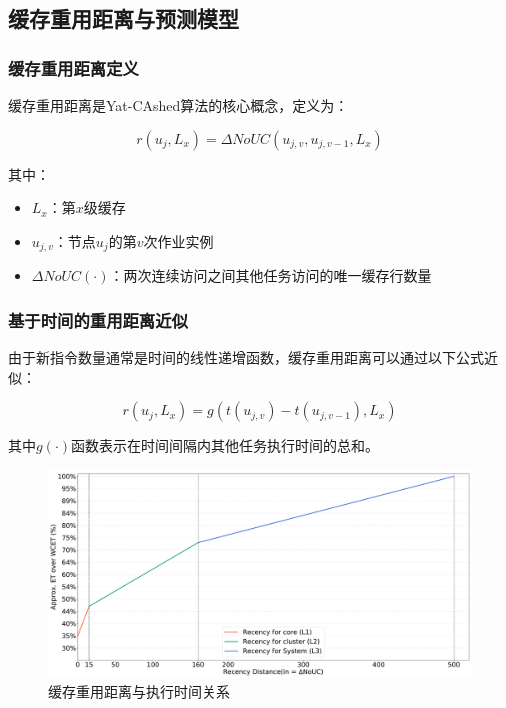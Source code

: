 \subsection{缓存重用距离与预测模型}

\subsubsection{缓存重用距离定义}

缓存重用距离是Yat-CAshed算法的核心概念，定义为：

\begin{tcolorbox}[
    colback=purple!5!white,
    colframe=purple!50!black,
    arc=3pt,
    center
]
$$r(u_j, L_x) = \Delta NoUC(u_{j,v}, u_{j,v-1}, L_x)$$
\end{tcolorbox}

其中：
\begin{tcolorbox}[
    colback=pink!10!white,
    colframe=pink!50!black,
    arc=3pt,
    left=5pt,
    right=5pt
]
\begin{itemize}    \item \textbf{$L_x$}：第$x$级缓存
    \item \textbf{$u_{j,v}$}：节点$u_j$的第$v$次作业实例
    \item \textbf{$\Delta NoUC(\cdot)$}：两次连续访问之间其他任务访问的唯一缓存行数量
\end{itemize}
\end{tcolorbox}

\subsubsection{基于时间的重用距离近似}

由于新指令数量通常是时间的线性递增函数，缓存重用距离可以通过以下公式近似：

\begin{tcolorbox}[
    colback=green!5!white,
    colframe=green!50!black,
    arc=3pt,
    center
]
$$r(u_j, L_x) = g(t(u_{j,v}) - t(u_{j,v-1}), L_x)$$
\end{tcolorbox}

其中$g(\cdot)$函数表示在时间间隔内其他任务执行时间的总和。

\begin{figure}[H]
\centering
\includegraphics[width=1.00\textwidth]{img/CRP_theory_model1.pdf}
\caption{缓存重用距离与执行时间关系}
\label{fig:cache_recency_timeline}
\end{figure}

